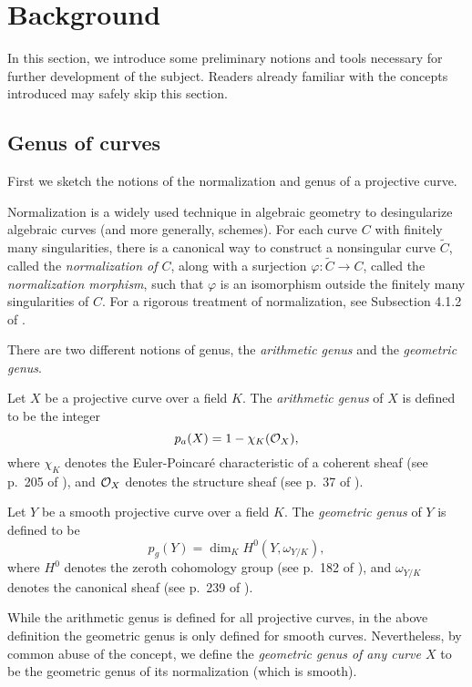 \section{Background}
\label{sec:pre}

In this section, we introduce some preliminary notions and tools
necessary for further development of the subject. Readers already
familiar with the concepts introduced may safely skip this section.

\subsection{Genus of curves}

First we sketch the notions of the normalization and genus of a
projective curve.

Normalization is a widely used technique in algebraic geometry to
desingularize algebraic curves (and more generally, schemes). For each
curve $C$ with finitely many singularities, there is a canonical way
to construct a nonsingular curve $\tilde{C}$, called the
\emph{normalization of $C$}, along with a surjection $\varphi:
\tilde{C} \to C$, called the \emph{normalization morphism}, such that
$\varphi$ is an isomorphism outside the finitely many singularities of
$C$. For a rigorous treatment of normalization, see Subsection 4.1.2
of \cite{MR1917232}.

There are two different notions of genus, the \emph{arithmetic genus}
and the \emph{geometric genus}.

\begin{definition}
  Let $X$ be a projective curve over a field $K$. The \emph{arithmetic
    genus} of $X$ is defined to be the integer
  \[
  p_a(X) = 1 - \chi_K(\mathcal{O}_X),
  \]
  where $\chi_K$ denotes the Euler-Poincar\'e characteristic of a
  coherent sheaf (see p.~205 of \cite{MR1917232}), and $\mathcal{O}_X$ denotes
  the structure sheaf (see p.~37 of \cite{MR1917232}).
\end{definition}

\begin{definition}
  Let $Y$ be a smooth projective curve over a field $K$. The
  \emph{geometric genus} of $Y$ is defined to be
  \[
  p_g(Y) = \dim_K H^0(Y, \omega_{Y/K}),
  \]
  where $H^0$ denotes the zeroth cohomology group (see p.~182 of
  \cite{MR1917232}), and $\omega_{Y/K}$ denotes the canonical sheaf
  (see p.~239 of \cite{MR1917232}).
\end{definition}

\begin{remark}
  \label{rem:abuse}
  While the arithmetic genus is defined for all projective curves, in
  the above definition the geometric genus is only defined for smooth
  curves. Nevertheless, by common abuse of the concept, we define the
  \emph{geometric genus of any curve $X$} to be the geometric genus of
  its normalization (which is smooth).
\end{remark}

